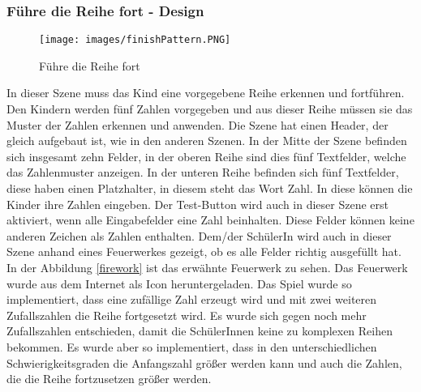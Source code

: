 \subsubsection{Führe die Reihe fort - Design}
\begin{figure}[htbp]
  \centering
  \texttt{[image: images/finishPattern.PNG]}
  \caption{Führe die Reihe fort}
  \label{finishPattern}
\end{figure}
In dieser Szene muss das Kind eine vorgegebene Reihe erkennen und fortführen. Den Kindern werden fünf Zahlen vorgegeben und aus dieser Reihe müssen sie das Muster der Zahlen erkennen und anwenden. Die Szene hat einen Header, der gleich aufgebaut ist, wie in den anderen Szenen. In der Mitte der Szene befinden sich insgesamt zehn Felder, in der oberen Reihe sind dies fünf Textfelder, welche das Zahlenmuster anzeigen. In der unteren Reihe befinden sich fünf Textfelder, diese haben einen Platzhalter, in diesem steht das Wort Zahl. In diese können die Kinder ihre Zahlen eingeben. Der Test-Button wird auch in dieser Szene erst aktiviert, wenn alle Eingabefelder eine Zahl beinhalten. Diese Felder können keine anderen Zeichen als Zahlen enthalten. Dem/der SchülerIn wird auch in dieser Szene anhand eines Feuerwerkes gezeigt, ob es alle Felder richtig ausgefüllt hat. In der Abbildung \ref{firework} ist das erwähnte Feuerwerk zu sehen. Das Feuerwerk wurde aus dem Internet als Icon heruntergeladen\autocite{Feuerwerk}. Das Spiel wurde so implementiert, dass eine zufällige Zahl erzeugt wird und mit zwei weiteren Zufallszahlen die Reihe fortgesetzt wird. Es wurde sich gegen noch mehr Zufallszahlen entschieden, damit die SchülerInnen keine zu komplexen Reihen bekommen. Es wurde aber so implementiert, dass in den unterschiedlichen Schwierigkeitsgraden die Anfangszahl größer werden kann und auch die Zahlen, die die Reihe fortzusetzen größer werden.
